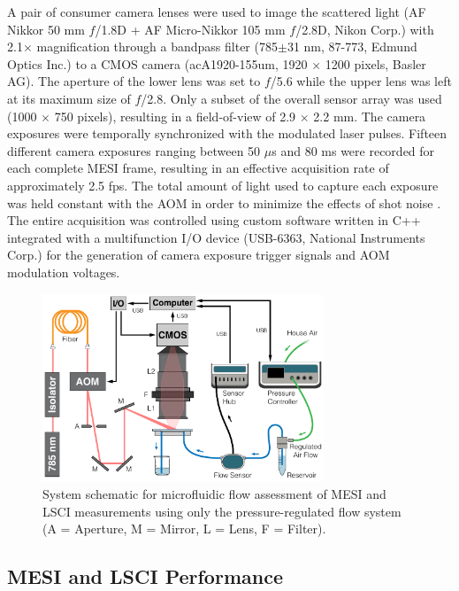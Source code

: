 \documentclass[12pt]{spieman}
\begin{document}
\begin{spacing}{2}
A pair of consumer camera lenses were used to image the scattered light (AF Nikkor 50 mm $f$/1.8D + AF Micro-Nikkor 105 mm $f$/2.8D, Nikon Corp.) with 2.1$\times$ magnification through a bandpass filter (785$\pm$31 nm, 87-773, Edmund Optics Inc.) to a CMOS camera (acA1920-155um, 1920 $\times$ 1200 pixels, Basler AG). The aperture of the lower lens was set to $f$/5.6 while the upper lens was left at its maximum size of $f$/2.8. Only a subset of the overall sensor array was used (1000 $\times$ 750 pixels), resulting in a field-of-view of 2.9 $\times$ 2.2 mm. The camera exposures were temporally synchronized with the modulated laser pulses. Fifteen different camera exposures ranging between 50 $\mu$s and 80 ms were recorded for each complete MESI frame, resulting in an effective acquisition rate of approximately 2.5 fps. The total amount of light used to capture each exposure was held constant with the AOM in order to minimize the effects of shot noise \cite{Parthasarathy:2008el}. The entire acquisition was controlled using custom software written in C++ integrated with a multifunction I/O device (USB-6363, National Instruments Corp.) for the generation of camera exposure trigger signals and AOM modulation voltages.

\begin{figure}
    \centering
    \includegraphics[width=0.75\textwidth]{Figure3.pdf}
    \caption {
        System schematic for microfluidic flow assessment of MESI and LSCI measurements using only the pressure-regulated flow system (A = Aperture, M = Mirror, L = Lens, F = Filter).
    }
    \label{fig:system_mesi}
\end{figure}


\subsection{MESI and LSCI Performance}
\label{sect:methods_mesi_lsci_measure}


\end{spacing}
\end{document}

